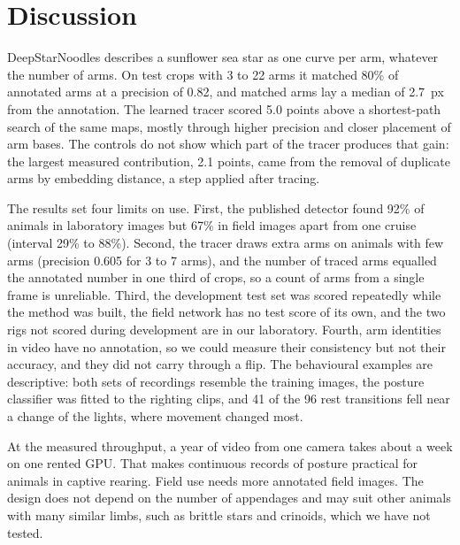 \section*{Discussion}

DeepStarNoodles describes a sunflower sea star as one curve per arm, whatever the number of arms.
On test crops with 3 to 22 arms it matched 80\% of annotated arms at a precision of 0.82, and matched arms lay a median of 2.7~px from the annotation.
The learned tracer scored 5.0 points above a shortest-path search of the same maps, mostly through higher precision and closer placement of arm bases.
The controls do not show which part of the tracer produces that gain: the largest measured contribution, 2.1 points, came from the removal of duplicate arms by embedding distance, a step applied after tracing.

The results set four limits on use.
First, the published detector found 92\% of animals in laboratory images but 67\% in field images apart from one cruise (interval 29\% to 88\%).
Second, the tracer draws extra arms on animals with few arms (precision 0.605 for 3 to 7 arms), and the number of traced arms equalled the annotated number in one third of crops, so a count of arms from a single frame is unreliable.
Third, the development test set was scored repeatedly while the method was built, the field network has no test score of its own, and the two rigs not scored during development are in our laboratory.
Fourth, arm identities in video have no annotation, so we could measure their consistency but not their accuracy, and they did not carry through a flip.
The behavioural examples are descriptive: both sets of recordings resemble the training images, the posture classifier was fitted to the righting clips, and 41 of the 96 rest transitions fell near a change of the lights, where movement changed most.

At the measured throughput, a year of video from one camera takes about a week on one rented GPU.
That makes continuous records of posture practical for animals in captive rearing.
Field use needs more annotated field images.
The design does not depend on the number of appendages and may suit other animals with many similar limbs, such as brittle stars and crinoids, which we have not tested.
